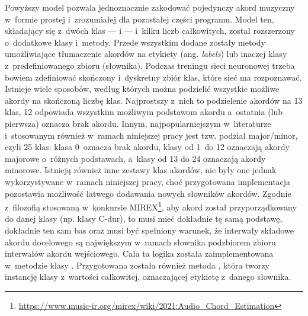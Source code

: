 Powyższy model pozwala jednoznacznie zakodować pojedynczy akord muzyczny w~formie prostej i~zrozumiałej dla pozostałej części programu. Model ten, składający się z~dwóch klas ---  i  --- i~kilku liczb całkowitych, został rozszerzony o~dodatkowe klasy i~metody. Przede wszystkim dodane zostały metody umożliwiające tłumaczenie akordów na etykiety (ang. \emph{labels}) lub inaczej klasy z~predefiniowanego zbioru (słownika). Podczas treningu sieci neuronowej trzeba bowiem zdefiniować skończony i~dyskretny zbiór klas, które sieć ma rozpoznawać. Istnieje wiele sposobów, według których można podzielić wszystkie możliwe akordy na skończoną liczbę klas.  Najprostszy z~nich to podzielenie akordów na 13 klas, 12 odpowiada wszystkim możliwym podstawom akordu a~ostatnia (lub pierwsza) oznacza brak akordu. Innym, najpopularniejszym w~literaturze i~stosowanym również w~ramach niniejszej pracy jest tzw. podział major/minor, czyli 25 klas: klasa 0~oznacza brak akordu, klasy od 1~do 12 oznaczają akordy majorowe o~różnych podstawach, a~klasy od 13 do 24 oznaczają akordy minorowe. Istnieją również inne zestawy klas akordów, nie były one jednak wykorzystywane w~ramach niniejszej pracy, choć przygotowana implementacja pozostawia możliwość łatwego dodawania nowych słowników akordów. Zgodnie z~filozofią stosowaną w~konkursie MIREX\footnote{\url{https://www.music-ir.org/mirex/wiki/2021:Audio_Chord_Estimation}}, aby akord został przyporządkowany do danej klasy (np. klasy C-dur), to musi mieć dokładnie tę samą podstawę, dokładnie ten sam bas oraz musi być spełniony warunek, że interwały składowe akordu docelowego są największym w~ramach słownika podzbiorem zbioru interwałów akordu wejściowego. Cała ta logika została zaimplementowana w~metodzie  klasy . Przygotowana została również metoda , która tworzy instancję klasy  z~wartości całkowitej, oznaczającej etykietę z~danego słownika.

